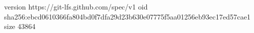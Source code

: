 version https://git-lfs.github.com/spec/v1
oid sha256:ebcd0610366fa804bd0f7dfa29d23b630e07775f5aa01256eb93ec17ed57cae1
size 43864

